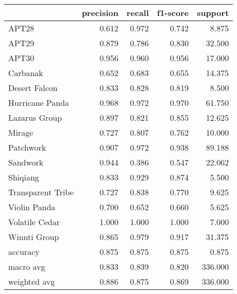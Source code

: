\begin{tabular}{lrrrr}
\toprule
{} &  precision &  recall &  f1-score &  support \\
\midrule
APT28             &      0.612 &   0.972 &     0.742 &    8.875 \\
APT29             &      0.879 &   0.786 &     0.830 &   32.500 \\
APT30             &      0.956 &   0.960 &     0.956 &   17.000 \\
Carbanak          &      0.652 &   0.683 &     0.655 &   14.375 \\
Desert Falcon     &      0.833 &   0.828 &     0.819 &    8.500 \\
Hurricane Panda   &      0.968 &   0.972 &     0.970 &   61.750 \\
Lazarus Group     &      0.897 &   0.821 &     0.855 &   12.625 \\
Mirage            &      0.727 &   0.807 &     0.762 &   10.000 \\
Patchwork         &      0.907 &   0.972 &     0.938 &   89.188 \\
Sandwork          &      0.944 &   0.386 &     0.547 &   22.062 \\
Shiqiang          &      0.833 &   0.929 &     0.874 &    5.500 \\
Transparent Tribe &      0.727 &   0.838 &     0.770 &    9.625 \\
Violin Panda      &      0.700 &   0.652 &     0.660 &    5.625 \\
Volatile Cedar    &      1.000 &   1.000 &     1.000 &    7.000 \\
Winnti Group      &      0.865 &   0.979 &     0.917 &   31.375 \\
accuracy          &      0.875 &   0.875 &     0.875 &    0.875 \\
macro avg         &      0.833 &   0.839 &     0.820 &  336.000 \\
weighted avg      &      0.886 &   0.875 &     0.869 &  336.000 \\
\bottomrule
\end{tabular}
